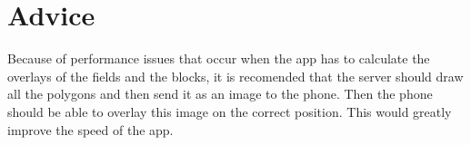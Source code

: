 \section{Advice}
Because of performance issues that occur when the app has to calculate the overlays of the fields and the blocks, it is recomended that the server should draw all the polygons and then send it as an image to the phone. Then the phone should be able to overlay this image on the correct position. This would greatly improve the speed of the app.

